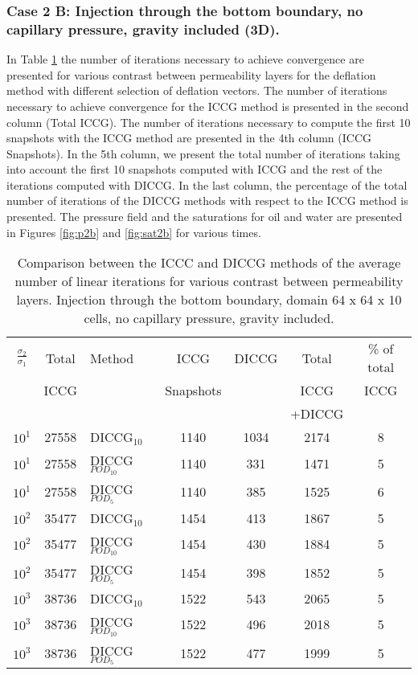 \documentclass[12pt]{article}
\begin{document}
\subsubsection*{Case 2 B: Injection through the bottom boundary, no capillary pressure, gravity included (3D).}
In Table \ref{table:liter2b} the number of iterations necessary to achieve convergence are presented for various contrast between permeability layers for the deflation method with different selection of deflation vectors. The number of iterations necessary to achieve convergence for the ICCG method is presented in the second column (Total ICCG). The number of iterations necessary to compute the first 10 snapshots with the ICCG method are presented in the 4th column (ICCG Snapshots). In the 5th column, we present the total number of iterations taking into account the first 10 snapshots computed with ICCG and the rest of the iterations computed with DICCG. In the last column, the percentage of the total number of iterations of the DICCG methods with respect to the ICCG method is presented.   
The pressure field and the saturations for oil and water are presented in Figures \ref{fig:p2b} and \ref{fig:sat2b} for various times.
\begin{table}[!h]\centering
\begin{minipage}{1\textwidth}
 \centering
\begin{tabular}{ ||c|c||l|c|c|c|c||} 
\hline
$\frac{\sigma_2}{\sigma_1}$&Total&Method  & ICCG&DICCG &Total&\% of total\\ 
                           & ICCG     &  & Snapshots& &ICCG& ICCG\\ 
                            &     &  & & &+DICCG& \\
\hline 
$10^{1}$ &27558& DICCG$_{10}$&1140&1034&2174&8\\ 
\hline  
$10^{1}$ &27558& DICCG$_{POD_{10}}$&1140&331&1471&5 \\ 
\hline  
$10^{1}$ &27558& DICCG$_{POD_{5}}$&1140&385&1525&6 \\ 
\hline  
$10^{2}$ &35477& DICCG$_{10}$&1454&413&1867&5\\ 
\hline  
$10^{2}$ &35477& DICCG$_{POD_{10}}$&1454&430&1884&5 \\ 
\hline  
$10^{2}$ &35477& DICCG$_{POD_{5}}$&1454&398&1852&5 \\ 
\hline
$10^{3}$ &38736& DICCG$_{10}$&1522&543&2065&5\\ 
\hline  
$10^{3}$ &38736& DICCG$_{POD_{10}}$&1522&496&2018&5 \\ 
\hline  
$10^{3}$ &38736& DICCG$_{POD_{5}}$&1522&477&1999&5 \\ 
\hline 
\end{tabular} 
\caption{Comparison between the ICCC and DICCG methods of the average number of linear iterations for various contrast between permeability layers. Injection through the bottom boundary, domain 64 x 64 x 10 cells, no capillary pressure, gravity included.}\label{table:liter2b} 
\end{minipage}  
\end{table}  
\end{document}

